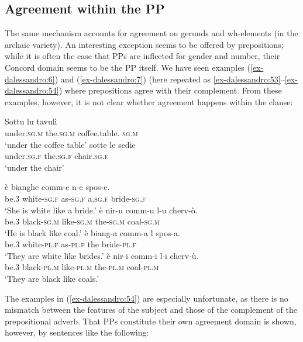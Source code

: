 \documentclass[output=paper
,modfonts
,nonflat]{langsci/langscibook}
\begin{document}
\subsection{Agreement within the PP} \label{sec-dalessandro:5.5}

The same mechanism accounts for agreement on gerunds and wh-elements (in the archaic variety). An interesting exception seems to be offered by prepositions; while it is often the case that PPs are inflected for gender and number, their Concord domain seems to be the PP itself. 
We have seen examples (\ref{ex-dalessandro:6}) and (\ref{ex-dalessandro:7}) (here repeated as \ref{ex-dalessandro:53}--\ref{ex-dalessandro:54}) where prepositions agree with their complement. From these examples, however, it is not clear whether agreement happens within the clause:

\begin{exe}
	\ex \label{ex-dalessandro:53}\citet[309]{Ledgeway2012} \xlist
	\ex 
	\gll Sottu      lu     tavulì \\
	under.\textsc{sg}.\textsc{m}   the.\textsc{sg}.\textsc{m}  coffee.table. \textsc{sg}.\textsc{m}\\
	\glt `under the coffee table' 
	\ex
	\gll  sotte     le     sedie\\
	under.\textsc{sg}.\textsc{f}  the.\textsc{sg}.\textsc{f}  chair.\textsc{sg}.\textsc{f}\\
	\glt `under the chair' 
	\endxlist

\ex\label{ex-dalessandro:54} \citet[54]{Lambertelli2003} \xlista
	\ex 
	\gll   è   bianghe   comm-e   n-e   spos-e.\\
	be.\textsc{3}  white-\textsc{sg.f} as-\textsc{sg.f}    a.\textsc{sg.f}  bride-\textsc{sg.f}\\
	\glt `She is white like a bride.' 
	\ex
	\gll  è   nir-u     comm-u   l-u     cherv-ò.\\
	be.3  black-\textsc{sg.m} like-\textsc{sg.m} the-\textsc{sg.m} coal-\textsc{sg.m}\\
	\glt `He is black like coal.' 
	\ex
	\gll  è  biang-a    comm-a  l  spos-a.\\
	be.3  white-\textsc{pl.f} as-\textsc{pl.f}    the  bride-\textsc{pl.f}\\
	\glt `They are white like brides.' 
	\ex
	\gll  è   nir-i     comm-i  l-i     cherv-ù.\\
	be.3   black-\textsc{pl.m} like-\textsc{pl.m} the-\textsc{pl.m} coal-\textsc{pl.m}\\
	\glt `They are black like coals.'
	\endxlista
\end{exe}
The examples in (\ref{ex-dalessandro:54}) are especially unfortunate, as there is no mismatch between the features of the subject and those of the complement of the prepositional adverb. That PPs constitute their own agreement domain is shown, however, by sentences like the following:
\end{document}
